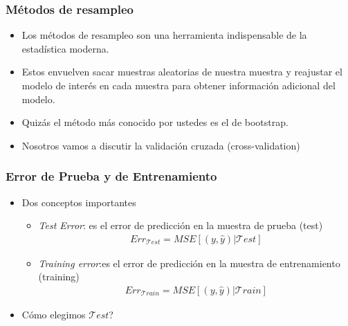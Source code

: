 \documentclass[
  shownotes,
  xcolor={svgnames},
  hyperref={colorlinks,citecolor=DarkBlue,linkcolor=DarkRed,urlcolor=DarkBlue}
  , aspectratio=169]{beamer}
\begin{document}
\begin{frame}[fragile]
\frametitle{Métodos de resampleo}

\begin{itemize}
  \item Los métodos de resampleo son una herramienta indispensable de la estadística moderna.
  \medskip
  \item Estos envuelven sacar muestras aleatorias de nuestra muestra y reajustar el modelo de interés en cada muestra para obtener información adicional del modelo.
  \medskip
  \item Quizás el método más conocido por ustedes es el de bootstrap.
  \medskip
  \item Nosotros vamos a discutir la validación cruzada (cross-validation)
\end{itemize}

\end{frame}
\begin{frame}[fragile]
\frametitle{Error de Prueba y de Entrenamiento}


\begin{itemize}

\item Dos conceptos importantes
\medskip
\begin{itemize}
  \item {\it Test Error}: es el error de predicción en la muestra de prueba (test)
  \medskip
  \begin{align}
    Err_{\mathcal{T}est} =MSE[(y,\hat y)|\mathcal{T}est]
  \end{align}
  \medskip
  \item {\it Training error}:es el error de predicción en la muestra de entrenamiento (training)
  \medskip
  \begin{align}
    Err_{\mathcal{T}rain} = MSE[(y,\hat y)|\mathcal{T}rain]
  \end{align}
    \end{itemize}
    \medskip
  \item Cómo elegimos $\mathcal{T}est$?
  
\end{itemize}



\end{frame}
\end{document}
